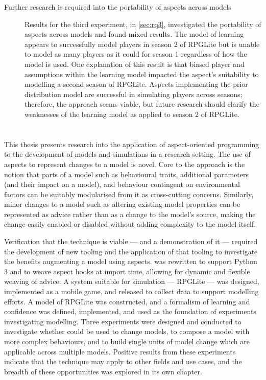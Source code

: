 \begin{description}
  \item[Further research is required into the portability of aspects across
  models] Results for the third experiment, in \cref{sec:rq3}, investigated the
  portability of aspects across models and found mixed results. The model of
  learning appears to successfully model players in season 2 of RPGLite but is
  unable to model as many players as it could for season 1 regardless of how the
  model is used. One explanation of this result is that biased player and
  assumptions within the learning model impacted the aspect's suitability to
  modelling a second season of RPGLite. Aspects implementing the prior
  distribution model are successful in simulating players across seasons;
  therefore, the approach seems viable, but future research should clarify the
  weaknesses of the learning model as applied to season 2 of RPGLite. 

\end{description}





\section{\thesistitle}


This thesis presents research into the application of aspect-oriented
programming to the development of models and simulations in a research setting. The use of aspects to
represent changes to a model is novel. Core to the approach is the notion that
parts of a model such as behavioural traits, additional parameters (and their
impact on a model), and behaviour contingent on environmental factors can be
suitably modularised from it as cross-cutting concerns. Similarly, minor changes
to a model such as altering existing model properties can be represented as
advice rather than as a change to the model's source, making the change easily
enabled or disabled without adding complexity to the model itself.

Verification that the technique is viable --- and a demonstration of it ---
required the development of new tooling and the application of that tooling to
investigate the benefits augmenting a model using aspects. \pdsf{} was rewritten
to support Python 3 and to weave aspect hooks at import time, allowing for
dynamic and flexible weaving of advice. A system suitable for simulation ---
RPGLite --- was designed, implemented as a mobile game, and released to collect
data to support modelling efforts. A model of RPGLite was constructed, and a
formalism of learning and confidence was defined, implemented, and used as the
foundation of experiments investigating \aspectoriented{} modelling. Three
experiments were designed and conducted to investigate whether \aop{} could
be used to change models, to compose a model with more complex behaviours, and
to build single units of model change which are applicable across multiple
models. Positive results from these experiments indicate that the technique may
apply to other fields and use cases, and the breadth of these opportunities was
explored in its own chapter.

